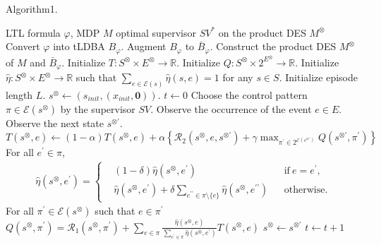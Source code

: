 \documentclass[letterpaper, 10 pt, conference]{ieeeconf}
\newcommand{\myspq}{\ensuremath{[\![s^{\otimes}]\!]}_q}
\begin{document}
\begin{algorithm}
 \caption{Algorithm1.}
 \begin{algorithmic}[1]
 \renewcommand{\algorithmicrequire}{\textbf{Input:}}
 \renewcommand{\algorithmicensure}{\textbf{Output:}}
 \REQUIRE LTL formula $\varphi$, MDP $M$
 \ENSURE  optimal supervisor $SV^{\ast}$ on the product DES $M^{\otimes}$
  \STATE Convert $\varphi$ into tLDBA $B_{\varphi}$.
  \STATE Augment $B_{\varphi}$ to $\bar{B}_{\varphi}$.
  \STATE Construct the product DES $M^{\otimes}$ of $M$ and $\bar{B}_{\varphi}$.
  \STATE Initialize $T:S^{\otimes} \times E^{\otimes} \rightarrow \mathbb{R}$.
  \STATE Initialize $Q:S^{\otimes} \times 2^{E^{\otimes}} \rightarrow \mathbb{R}$.
  \STATE Initialize $\hat{\eta}:S^{\otimes} \times E^{\otimes} \rightarrow \mathbb{R}$ such that $\sum_{e \in \mathcal{E}(s)} \hat{\eta}(s,e) = 1$ for any $s \in S$.
  \STATE Initialize episode length $L$.
  \STATE $s^{\otimes} \leftarrow (s_{init},(x_{init},\bm{0}))$.
  \STATE $t \leftarrow 0$
  \WHILE {$t <L$ and $\myspq \notin SinkSet$ }
  \STATE Choose the control pattern $\pi \in \mathcal{E}(s^{\otimes})$ by the supervisor $SV$.
  \STATE Observe the occurrence of the event $e \in E$.
  \STATE Observe the next state $s^{\otimes \prime}$.
  \STATE $T(s^{\otimes},e) \leftarrow (1-\alpha)T(s^{\otimes},e) + \alpha \left \{ \mathcal{R}_2(s^{\otimes},e,s^{\otimes \prime}) + \gamma \max_{\pi^{\prime} \in 2^{\mathcal{E}(s^{\otimes \prime})}}Q(s^{\otimes \prime},\pi^{\prime}) \right \}$
  \STATE For all $e^{\prime} \in \pi$,
          \begin{align}
            \hat{\eta}(s^{\otimes},e^{\prime}) =
            \left\{
            \begin{aligned}
              & (1 - \delta) \hat{\eta}(s^{\otimes},e^{\prime})   & &\text{if}\  e = e^{\prime},\\
              & \hat{\eta}(s^{\otimes},e^{\prime}) + \delta \sum_{e^{\prime \prime} \in \pi \setminus \{e\}} \hat{\eta}(s^{\otimes},e^{\prime \prime})   & &\text{otherwise}.
            \end{aligned}
            \right. \nonumber
          \end{align}
  \STATE For all $\pi^{\prime} \in \mathcal{E}(s^{\otimes})$ such that $e \in \pi^{\prime}$\\
          $Q(s^{\otimes},\pi^{\prime}) = \mathcal{R}_1(s^{\otimes},\pi^{\prime}) + \sum_{e \in \pi} \frac{\hat{\eta}(s^{\otimes},e)}{\sum_{e^{\prime} \in \pi} \hat{\eta}(s^{\otimes},e^{\prime})} T(s^{\otimes},e)$
  \STATE $s^{\otimes} \leftarrow s^{\otimes \prime}$
  \STATE $t \leftarrow t + 1$
  \ENDWHILE
  \ENDWHILE
 \end{algorithmic}
 \label{alg1}
 \end{algorithm}
\end{document}
